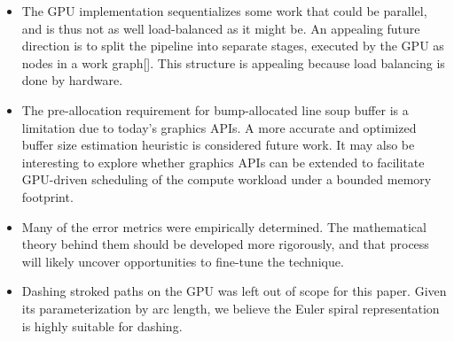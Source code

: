 \documentclass[sigconf, authordraft]{acmart}
\begin{document}
\begin{itemize}
    \item The GPU implementation sequentializes some work that could be parallel, and is thus not as well load-balanced as it might be. An appealing future direction is to split the pipeline into separate stages, executed by the GPU as nodes in a work graph[]. This structure is appealing because load balancing is done by hardware.

    \item The pre-allocation requirement for bump-allocated line soup buffer is a limitation due to today's graphics APIs. A more accurate and optimized buffer size estimation heuristic is considered future work. It may also be interesting to explore whether graphics APIs can be extended to facilitate GPU-driven scheduling of the compute workload under a bounded memory footprint.

    \item Many of the error metrics were empirically determined. The mathematical theory behind them should be developed more rigorously, and that process will likely uncover opportunities to fine-tune the technique.

    \item Dashing stroked paths on the GPU was left out of scope for this paper. Given its parameterization by arc length, we believe the Euler spiral representation is highly suitable for dashing.
\end{itemize}




\end{document}
